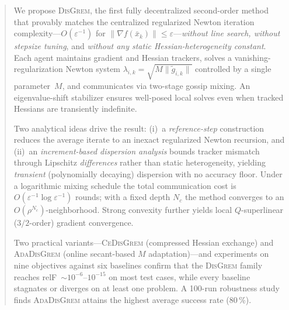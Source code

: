 \documentclass[10pt,twocolumn,letterpaper]{article}
\title{}
\author{}
\date{}
\def\cO{O}%
\theoremstyle{compact}
\theoremstyle{compactremark}
\newcommand{\cO}{\mathcal{O}}
\begin{document}
	\maketitle
	\vspace{-4pt}

\renewcommand{\abstractname}{\normalsize\bfseries Abstract}
\begin{abstract}\small\noindent
	We propose \textsc{DisGrem}, the first fully decentralized
	second-order method that provably matches the centralized
	regularized Newton iteration complexity---$\cO(\varepsilon^{-1})$
	for $\|\nabla f(\bar x_k)\|\le\varepsilon$---\emph{without line
	search, without stepsize tuning}, and \emph{without any static
	Hessian-heterogeneity constant}.
	Each agent maintains gradient and Hessian trackers, solves
	a vanishing-regularization Newton system
	$\lambda_{i,k}=\sqrt{M\|\tilde g_{i,k}\|}$ controlled by a single
	parameter~$M$, and communicates via two-stage gossip mixing.
	An eigenvalue-shift stabilizer ensures well-posed local solves
	even when tracked Hessians are transiently indefinite.
	
	Two analytical ideas drive the result:
	(i)~a \emph{reference-step} construction reduces the average
	iterate to an inexact regularized Newton recursion, and
	(ii)~an \emph{increment-based dispersion analysis} bounds
	tracker mismatch through Lipschitz \emph{differences} rather
	than static heterogeneity, yielding \emph{transient} (polynomially
	decaying) dispersion with no accuracy floor.
	Under a logarithmic mixing schedule the total communication
	cost is $\cO(\varepsilon^{-1}\log\varepsilon^{-1})$ rounds; with
	a fixed depth $N_c$ the method converges to an
	$\cO(\rho^{N_c})$-neighborhood.
	Strong convexity further yields local $Q$-superlinear ($3/2$-order)
	gradient convergence.
	
	Two practical variants---\textsc{CeDisGrem} (compressed Hessian
	exchange) and \textsc{AdaDisGrem} (online secant-based $M$
	adaptation)---and experiments on nine objectives against six
	baselines confirm that the \textsc{DisGrem} family reaches
	relF~$\sim\!10^{-6}$--$10^{-15}$ on most test cases, while
	every baseline stagnates or diverges on at least one problem.
	A 100-run robustness study finds \textsc{AdaDisGrem} attains
	the highest average success rate (80\,\%).
\end{abstract}
	
\end{document}
